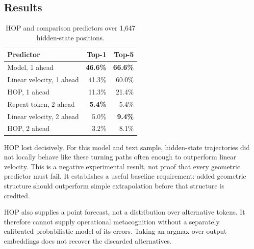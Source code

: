 \documentclass[11pt,a4paper]{article}
\begin{document}
\subsection{Results}
\begin{table}[htbp]
\centering
\caption{HOP and comparison predictors over 1,647 hidden-state positions.}
\label{tab:hop}
\begin{tabular}{lrr}
\toprule
Predictor & Top-1 & Top-5 \\
\midrule
Model, 1 ahead & \textbf{46.6\%} & \textbf{66.6\%} \\
Linear velocity, 1 ahead & 41.3\% & 60.0\% \\
HOP, 1 ahead & 11.3\% & 21.4\% \\
Repeat token, 2 ahead & \textbf{5.4\%} & 5.4\% \\
Linear velocity, 2 ahead & 5.0\% & \textbf{9.4\%} \\
HOP, 2 ahead & 3.2\% & 8.1\% \\
\bottomrule
\end{tabular}
\end{table}

HOP lost decisively. For this model and text sample, hidden-state trajectories did not locally behave like these turning paths often enough to outperform linear velocity. This is a negative experimental result, not proof that every geometric predictor must fail. It establishes a useful baseline requirement: added geometric structure should outperform simple extrapolation before that structure is credited.

HOP also supplies a point forecast, not a distribution over alternative tokens. It therefore cannot supply operational metacognition without a separately calibrated probabilistic model of its errors. Taking an argmax over output embeddings does not recover the discarded alternatives.
\end{document}
